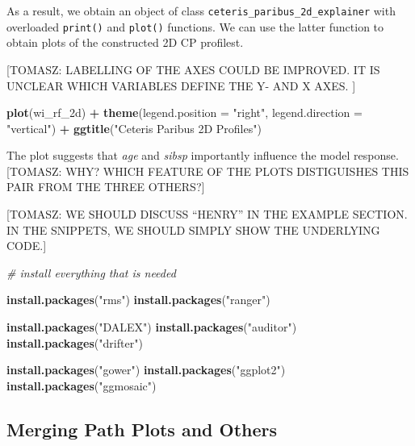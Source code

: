 \documentclass[12pt,]{krantz}
\newenvironment{Shaded}{\begin{snugshade}}{\end{snugshade}}
\newcommand{\CommentTok}[1]{\textcolor[rgb]{0.56,0.35,0.01}{\textit{#1}}}
\newcommand{\DataTypeTok}[1]{\textcolor[rgb]{0.13,0.29,0.53}{#1}}
\newcommand{\KeywordTok}[1]{\textcolor[rgb]{0.13,0.29,0.53}{\textbf{#1}}}
\newcommand{\NormalTok}[1]{#1}
\newcommand{\OperatorTok}[1]{\textcolor[rgb]{0.81,0.36,0.00}{\textbf{#1}}}
\newcommand{\StringTok}[1]{\textcolor[rgb]{0.31,0.60,0.02}{#1}}
\begin{document}
As a result, we obtain an object of class \texttt{ceteris\_paribus\_2d\_explainer} with overloaded \texttt{print()} and \texttt{plot()} functions. We can use the latter function to obtain plots of the constructed 2D CP profilest.

{[}TOMASZ: LABELLING OF THE AXES COULD BE IMPROVED. IT IS UNCLEAR WHICH VARIABLES DEFINE THE Y- AND X AXES. {]}

\begin{Shaded}
\begin{Highlighting}[]
\KeywordTok{plot}\NormalTok{(wi_rf_2d) }\OperatorTok{+}\StringTok{ }
\StringTok{  }\KeywordTok{theme}\NormalTok{(}\DataTypeTok{legend.position =} \StringTok{"right"}\NormalTok{, }\DataTypeTok{legend.direction =} \StringTok{"vertical"}\NormalTok{) }\OperatorTok{+}\StringTok{ }\KeywordTok{ggtitle}\NormalTok{(}\StringTok{"Ceteris Paribus 2D Profiles"}\NormalTok{)}
\end{Highlighting}
\end{Shaded}

The plot suggests that \emph{age} and \emph{sibsp} importantly influence the model response. {[}TOMASZ: WHY? WHICH FEATURE OF THE PLOTS DISTIGUISHES THIS PAIR FROM THE THREE OTHERS?{]}

{[}TOMASZ: WE SHOULD DISCUSS ``HENRY'' IN THE EXAMPLE SECTION. IN THE SNIPPETS, WE SHOULD SIMPLY SHOW THE UNDERLYING CODE.{]}

\begin{Shaded}
\begin{Highlighting}[]
\CommentTok{# install everything that is needed}

\KeywordTok{install.packages}\NormalTok{(}\StringTok{"rms"}\NormalTok{)}
\KeywordTok{install.packages}\NormalTok{(}\StringTok{"ranger"}\NormalTok{)}

\KeywordTok{install.packages}\NormalTok{(}\StringTok{"DALEX"}\NormalTok{)}
\KeywordTok{install.packages}\NormalTok{(}\StringTok{"auditor"}\NormalTok{)}
\KeywordTok{install.packages}\NormalTok{(}\StringTok{"drifter"}\NormalTok{)}

\KeywordTok{install.packages}\NormalTok{(}\StringTok{"gower"}\NormalTok{)}
\KeywordTok{install.packages}\NormalTok{(}\StringTok{"ggplot2"}\NormalTok{)}
\KeywordTok{install.packages}\NormalTok{(}\StringTok{"ggmosaic"}\NormalTok{)}
\end{Highlighting}
\end{Shaded}

\hypertarget{factorMerger}{%
\subsection{Merging Path Plots and Others}\label{factorMerger}}
\end{document}
